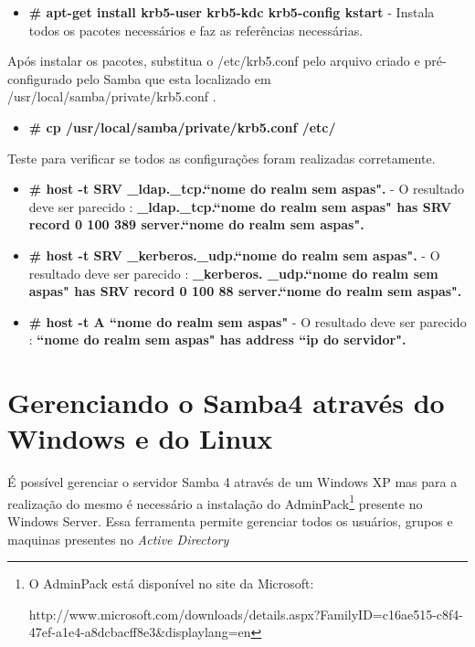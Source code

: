 \begin{itemize}
	\item \textbf{\# apt-get install krb5-user krb5-kdc krb5-config kstart} - Instala todos os pacotes necessários e faz as referências necessárias.
\end{itemize}

Após instalar os pacotes, substitua o /etc/krb5.conf pelo arquivo criado e pré-configurado pelo Samba que esta localizado em /usr/local/samba/private/krb5.conf .

\begin{itemize}
	\item \textbf{\# cp /usr/local/samba/private/krb5.conf  /etc/}
\end{itemize}

Teste para verificar se todos as configurações foram realizadas corretamente.

\begin{itemize}
	\item \textbf{\# host -t SRV \_ldap.\_tcp.``nome do realm sem aspas".} - O resultado deve ser parecido : \textbf{\_ldap.\_tcp.``nome do realm sem aspas" has SRV record 0 100 389 server.``nome do realm sem aspas".}
	\item \textbf{\# host -t SRV \_kerberos.\_udp.``nome do realm sem aspas".} - O resultado deve ser parecido : \textbf{\_kerberos. \_udp.``nome do realm sem aspas" has SRV record 0 100 88 server.``nome do realm sem aspas".}
	\item \textbf{\# host -t A ``nome do realm sem aspas"} - O resultado deve ser parecido : \textbf{``nome do realm sem aspas" has address ``ip do servidor".} 
\end{itemize}

\section{Gerenciando o Samba4 através do Windows e do Linux}

É possível gerenciar o servidor Samba 4 através de um Windows XP mas para a realização do mesmo é necessário a instalação do AdminPack\footnote[4]{O AdminPack está disponível no site da Microsoft:

http://www.microsoft.com/downloads/details.aspx?FamilyID=c16ae515-c8f4-47ef-a1e4-a8dcbacff8e3\&displaylang=en} presente no Windows Server. Essa ferramenta permite gerenciar todos os usuários, grupos e maquinas presentes no \textit{Active Directory}

